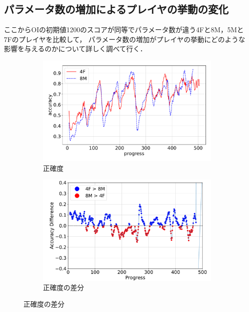 \subsection{パラメータ数の増加によるプレイヤの挙動の変化}
ここからOIの初期値1200のスコアが同等でパラメータ数が違う4Fと8M，5Mと7Fのプレイヤを比較して，
パラメータ数の増加がプレイヤの挙動にどのような影響を与えるのかについて詳しく調べて行く．
\begin{figure}[t]
\centering
\begin{subfigure}[b]{0.49\linewidth}
    \includegraphics[width=\linewidth]{pdf/compare/NT4F_and_NT8M/accuracy.pdf}
    \caption{正確度}
    \label{fig:NT4F_and_NT8M_accuracy}
\end{subfigure}
\begin{subfigure}[b]{0.49\linewidth}
    \includegraphics[width=\linewidth]{pdf/compare/NT4F_and_NT8M/acc_diff_plot.pdf}
    \caption{正確度の差分}
    \label{fig:NT4F_and_NT8M_acc_diff}
\end{subfigure}

\end{figure}
